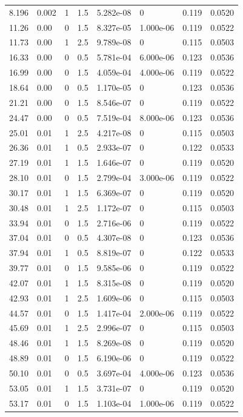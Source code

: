 \documentclass[preview]{standalone}
\begin{document}
{{\begin{tabular}{L{1.2cm}C{1.2cm} C{0.3cm}C{0.5cm} C{1.4cm}C{1.4cm} C{1.4cm}C{1.4cm}}
  8.196  &  0.002  & 1     & 1.5 &  5.282e-08  & 0  & 0.119 &  0.0520   \\ 
  11.26  &  0.00  & 0     & 1.5 &  8.327e-05  & 1.000e-06  & 0.119 &  0.0522   \\ 
  11.73  &  0.00  & 1     & 2.5 &  9.789e-08  & 0  & 0.115 &  0.0503   \\ 
  16.33  &  0.00  & 0     & 0.5 &  5.781e-04  & 6.000e-06  & 0.123 &  0.0536   \\ 
  16.99  &  0.00  & 0     & 1.5 &  4.059e-04  & 4.000e-06  & 0.119 &  0.0522   \\ 
  18.64  &  0.00  & 0     & 0.5 &  1.170e-05  & 0  & 0.123 &  0.0536   \\ 
  21.21  &  0.00  & 0     & 1.5 &  8.546e-07  & 0  & 0.119 &  0.0522   \\ 
  24.47  &  0.00  & 0     & 0.5 &  7.519e-04  & 8.000e-06  & 0.123 &  0.0536   \\ 
  25.01  &  0.01  & 1     & 2.5 &  4.217e-08  & 0  & 0.115 &  0.0503   \\ 
  26.36  &  0.01  & 1     & 0.5 &  2.933e-07  & 0  & 0.122 &  0.0533   \\ 
  27.19  &  0.01  & 1     & 1.5 &  1.646e-07  & 0  & 0.119 &  0.0520   \\ 
  28.10  &  0.01  & 0     & 1.5 &  2.799e-04  & 3.000e-06  & 0.119 &  0.0522   \\ 
  30.17  &  0.01  & 1     & 1.5 &  6.369e-07  & 0  & 0.119 &  0.0520   \\ 
  30.48  &  0.01  & 1     & 2.5 &  1.172e-07  & 0  & 0.115 &  0.0503   \\ 
  33.94  &  0.01  & 0     & 1.5 &  2.716e-06  & 0  & 0.119 &  0.0522   \\ 
  37.04  &  0.01  & 0     & 0.5 &  4.307e-08  & 0  & 0.123 &  0.0536   \\ 
  37.94  &  0.01  & 1     & 0.5 &  8.819e-07  & 0  & 0.122 &  0.0533   \\ 
  39.77  &  0.01  & 0     & 1.5 &  9.585e-06  & 0  & 0.119 &  0.0522   \\ 
  42.07  &  0.01  & 1     & 1.5 &  8.315e-08  & 0  & 0.119 &  0.0520   \\ 
  42.93  &  0.01  & 1     & 2.5 &  1.609e-06  & 0  & 0.115 &  0.0503   \\ 
  44.57  &  0.01  & 0     & 1.5 &  1.417e-04  & 2.000e-06  & 0.119 &  0.0522   \\ 
  45.69  &  0.01  & 1     & 2.5 &  2.996e-07  & 0  & 0.115 &  0.0503   \\ 
  48.46  &  0.01  & 1     & 1.5 &  8.269e-08  & 0  & 0.119 &  0.0520   \\ 
  48.89  &  0.01  & 0     & 1.5 &  6.190e-06  & 0  & 0.119 &  0.0522   \\ 
  50.10  &  0.01  & 0     & 0.5 &  3.697e-04  & 4.000e-06  & 0.123 &  0.0536   \\ 
  53.05  &  0.01  & 1     & 1.5 &  3.731e-07  & 0  & 0.119 &  0.0520   \\ 
  53.17  &  0.01  & 0     & 1.5 &  1.103e-04  & 1.000e-06  & 0.119 &  0.0522   \\ 
\hline 
\end{tabular} 

}}
\end{document}
